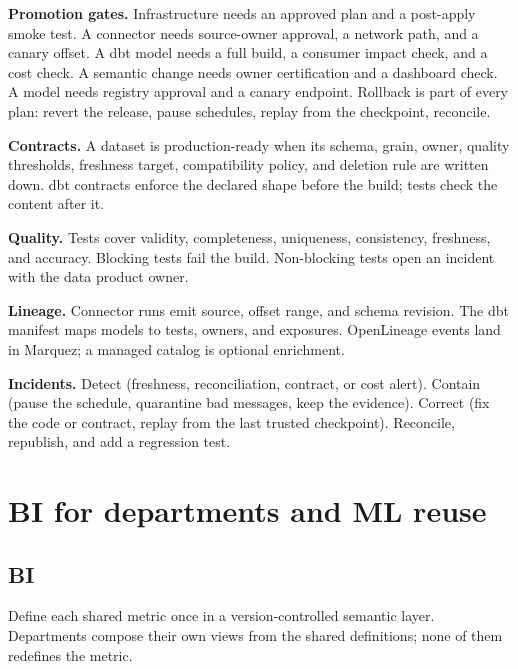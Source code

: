 \documentclass[10pt,a4paper]{article}
\begin{document}
\textbf{Promotion gates.} Infrastructure needs an approved plan and a
post-apply smoke test. A connector needs source-owner approval, a network
path, and a canary offset. A dbt model needs a full build, a consumer
impact check, and a cost check. A semantic change needs owner
certification and a dashboard check. A model needs registry approval and
a canary endpoint. Rollback is part of every plan: revert the release,
pause schedules, replay from the checkpoint, reconcile.

\textbf{Contracts.} A dataset is production-ready when its schema,
grain, owner, quality thresholds, freshness target, compatibility policy,
and deletion rule are written down. dbt contracts enforce the declared
shape before the build; tests check the content after
it.\cite{dbtContracts}

\textbf{Quality.} Tests cover validity, completeness, uniqueness,
consistency, freshness, and accuracy. Blocking tests fail the build.
Non-blocking tests open an incident with the data product owner.

\textbf{Lineage.} Connector runs emit source, offset range, and schema
revision. The dbt manifest maps models to tests, owners, and exposures.
OpenLineage events land in Marquez; a managed catalog is optional
enrichment.\cite{openlineageDBT,dbtExposures}

\textbf{Incidents.} Detect (freshness, reconciliation, contract, or cost
alert). Contain (pause the schedule, quarantine bad messages, keep the
evidence). Correct (fix the code or contract, replay from the last
trusted checkpoint). Reconcile, republish, and add a regression test.

\section{BI for departments and ML reuse}

\subsection{BI}

Define each shared metric once in a version-controlled semantic layer.
Departments compose their own views from the shared definitions; none of
them redefines the metric.\cite{gcLookML,gcLookerAccess}
\end{document}
